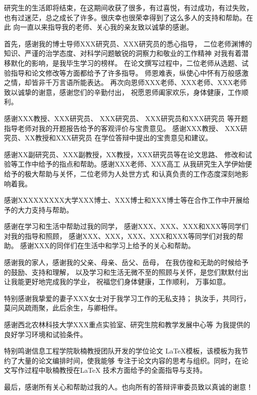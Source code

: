 \begin{acknowledgement}

研究生的生活即将结束，在这期间收获了很多，有过喜悦，有过成功，有过失败，
也有过迷茫，总之成长了许多。很庆幸也很荣幸得到了这么多人的支持和帮助。在此
向一直以来指导我的老师、关心我的亲友致以诚挚的感谢。

首先，感谢我的博士导师XXX研究员、XXX研究员的悉心指导，
二位老师渊博的知识、严谨的治学态度、对科学问题敏锐的洞察力和敬业的工作精神
对我有着潜移默化的影响，是我毕生学习的榜样。
在论文撰写过程中，二位老师从选题、试验指导和论文修改等方面都给予了许多指导。
师恩难表，纵使心中怀有万般感激之情，却皆非千万言语所能表达。
再次向恩师XXX老师、XXX老师、XXX老师致以诚挚的谢意，感谢您们的辛勤付出，
祝愿恩师阖家欢乐，身体健康，工作顺利。

感谢XXX教授、XXX研究员、 XXX研究员、 XXX研究员和XXX研究员
等开题指导老师对我的开题报告给予的客观评价与宝贵意见。 
感谢XXX教授、  XXX研究员、XX教授和XXX研究员
在学位答辩中提出的宝贵意见和建议。

感谢XX副研究员、XXX副教授，XX教授，XXX研究员等在论文思路、
修改和试验等工作中给予的指点和帮助。感谢XXX老师、XXX高工
从我研究生入学伊始便给予的极大帮助与关怀，二位老师为人处世方式
和认真负责的工作态度深刻地影响着我。

感谢XXXXXXXXX大学XXX博士、XXX博士和XXX博士等在合作工作中开展给予的大力支持与帮助。

感谢在学习和生活中帮助过我的同学，
感谢XXX、XXX、XXX和XXX等同学们对我的指导和照顾，
感谢XXX、XXX，XXX、XXX和XXX等同学们对我的帮助。
感谢XXX的同伴们在生活中和学习上给予的关心和帮助。

感谢我的家人，感谢我的父亲、母亲、岳父、岳母，
在我仿徨和无助的时候给予的鼓励、支持和理解，
以及学习和生活无微不至的照顾与关怀，是您们默默付出让我能更好地完成我的学业，
祝福您们身体健康，工作顺利， 万事如意。

特别感谢我挚爱的妻子XXX女士对于我学习工作的无私支持；
执汝手，共同行，莫问风疏雨聚，此后余生，与卿相伴。

感谢西北农林科技大学XXX重点实验室、研究生院和教学发展中心等
为我提供的良好学习环境和试验条件。

特别鸣谢信息工程学院耿楠教授团队开发的\nwafuthesis{}学位论文
\LaTeX{}模板，该模板为我节约了大量的论文编排时间，使我能够
专注于论文内容的思考与组织。同时，在论文写作过程中耿楠教授在\LaTeX{}
技术方面给予的全面指导与支持。

最后，感谢所有关心和帮助过我的人。也向所有的答辩评审委员致以真诚的谢意！\\


\end{acknowledgement}
